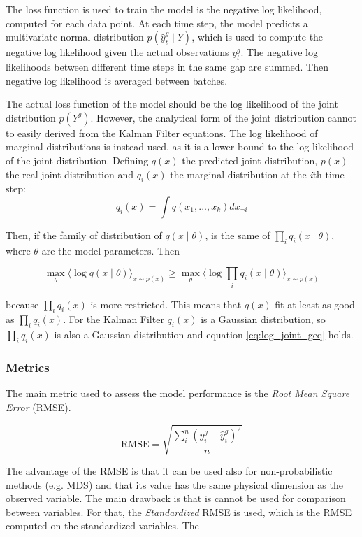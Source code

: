 \documentclass{article}
\newcommand{\E}[1]{\langle #1 \rangle} %
\begin{document}
The loss function is used to train the model is the negative log likelihood, computed for each data point. At each time step, the model predicts a multivariate normal distribution $p(\hat{y}^g_t \mid Y)$, which is used to compute the negative log likelihood given the actual observations $y_t^g$. The negative log likelihoods between different time steps in the same gap are summed. Then negative log likelihood is averaged between batches.

The actual loss function of the model should be the log likelihood of the joint distribution $p(Y^g)$. However, the analytical form of the joint distribution cannot to easily derived from the Kalman Filter equations. The log likelihood of marginal distributions is instead used, as it is a lower bound to the log likelihood of the joint distribution. Defining $q(x)$ the predicted joint distribution, $p(x)$ the real joint distribution and $q_i(x)$ the marginal distribution at the \textit{i}th time step:
\begin{equation}
    q_i(x) = \int q(x_1, ..., x_k)dx_{\neg i}
\end{equation}

Then, if the family of distribution of $q(x \mid \theta)$,  is the same of $\prod_i q_i(x \mid \theta)$, where $\theta$ are the model parameters. Then

\begin{equation}\label{eq:log_joint_geq}
    \max_\theta \E{\log q(x\mid \theta)}_{x \sim p(x)} \geq \max_\theta \E{\log \prod_i q_i(x\mid \theta)}_{x \sim p(x)}
\end{equation}

because $\prod_i q_i(x)$ is more restricted. This means that $q(x)$ fit at least as good as $\prod_i q_i(x)$.
For the Kalman Filter $q_i(x)$ is a Gaussian distribution, so $\prod_i q_i(x)$ is also a Gaussian distribution and equation \ref{eq:log_joint_geq} holds.

\subsubsection{Metrics}

The main metric used to assess the model performance is the \emph{Root Mean Square Error} (RMSE). 

\begin{equation}
    \text{RMSE} = \sqrt{\frac{\sum_i^n (y^g_i - \hat{y}^g_i)^2}{n}}
\end{equation}

The advantage of the RMSE is that it can be used also for non-probabilistic methods (e.g. MDS) and that its value has the same physical dimension as the observed variable. The main drawback is that is cannot be used for comparison between variables. For that, the \emph{Standardized} RMSE is used, which is the RMSE computed on the standardized variables. The 
\end{document}
